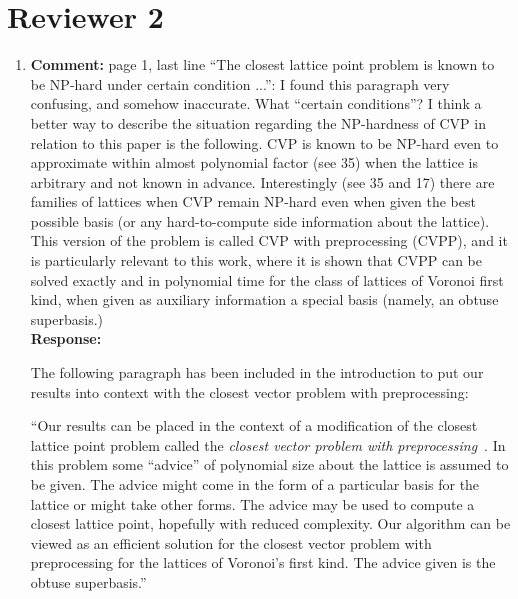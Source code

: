\documentclass[a4paper,10pt]{article}
\begin{document}
\section*{Reviewer 2}\label{sec:reviewer-2}

\begin{enumerate}
\item\textbf{Comment:}  \label{com:cvvp}
page 1, last line ``The closest lattice point problem is known to be NP-hard under certain condition ...'': I found this paragraph very confusing, and somehow inaccurate. What ``certain conditions''? I think a better way to describe the situation regarding the NP-hardness of CVP in relation to this paper is the following. CVP is known to be NP-hard even to approximate within almost polynomial factor (see 35) when the lattice is arbitrary and not known in advance. Interestingly (see 35 and 17) there are families of lattices when CVP remain NP-hard even when given the best possible basis (or any hard-to-compute side information about the lattice). This version of the problem is called CVP with preprocessing (CVPP), and it is particularly relevant to this work, where it is shown that CVPP can be solved exactly and in polynomial time for the class of lattices of Voronoi first kind, when given as auxiliary information a special basis (namely, an obtuse superbasis.) 
\\\textbf{Response:}

The following paragraph has been included in the introduction to put our results into context with the closest vector problem with preprocessing:

``Our results can be placed in the context of a modification of the closest lattice point problem called the \emph{closest vector problem with preprocessing}~\cite{micciancio_hardness_2001,feige_inapproximability_2004,Regev_2004_inappox_lattice_with_preprocessing,Aleknovish_hardness_with_preprocessing_2011,knot_hardness_cvvp_2014,Dadush_cvp_with_distance_guarantee_2014}.  In this problem some ``advice'' of polynomial size about the lattice is assumed to be given.  The advice might come in the form of a particular basis for the lattice or might take other forms.  The advice may be used to compute a closest lattice point, hopefully with reduced complexity.  %
Our algorithm can be viewed as an efficient solution for the closest vector problem with preprocessing for the lattices of Voronoi's first kind.  The advice given is the obtuse superbasis.''


\end{enumerate}
\end{document}

